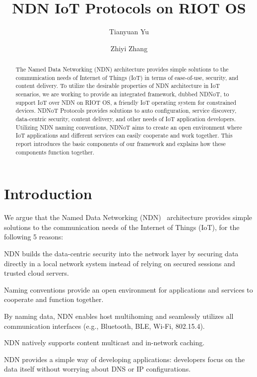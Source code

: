 \documentclass[sigconf]{acmart}
\begin{document}
\title{NDN IoT Protocols on RIOT OS}

\author{Tianyuan Yu}

\author{Zhiyi Zhang}

\begin{abstract}

The Named Data Networking (NDN) architecture provides simple solutions to the communication needs of Internet of Things (IoT) in terms of ease-of-use, security, and content delivery.
To utilize the desirable properties of NDN architecture in IoT scenarios, we are working to provide an integrated framework, dubbed NDNoT, to support IoT over NDN on RIOT OS, a friendly 
IoT operating system for constrained devices. NDNoT Protocols provides solutions to auto configuration, service discovery, data-centric security, content delivery, and other needs of IoT 
application developers. Utilizing NDN naming conventions, NDNoT aims to create an open environment where IoT applications and different services can easily cooperate and work together.
This report introduces the basic components of our framework and explains how these components function together. 
\end{abstract}

\copyrightyear{} 
\acmYear{} 
\acmConference[]{}{}{}

\maketitle

\section{Introduction}

We argue that the Named Data Networking (NDN)~\cite{ndn-ccr} architecture provides simple solutions to the communication needs of the Internet of Things (IoT), for the following 5 reasons:
\begin{enumerate*} [label=(\roman*)]
	\item NDN builds the data-centric security into the network layer by securing data directly in a local network system instead of relying on secured sessions and trusted cloud servers.
	\item Naming conventions provide an open environment for applications and services to cooperate and function together.
	\item By naming data, NDN enables host multihoming and seamlessly utilizes all  communication interfaces (e.g., Bluetooth, BLE, Wi-Fi, 802.15.4).
	\item NDN natively supports content multicast and in-network caching.
	\item NDN provides a simple way of developing applications: developers focus on the data itself without worrying about DNS or IP configurations.
\end{enumerate*}
\end{document}
